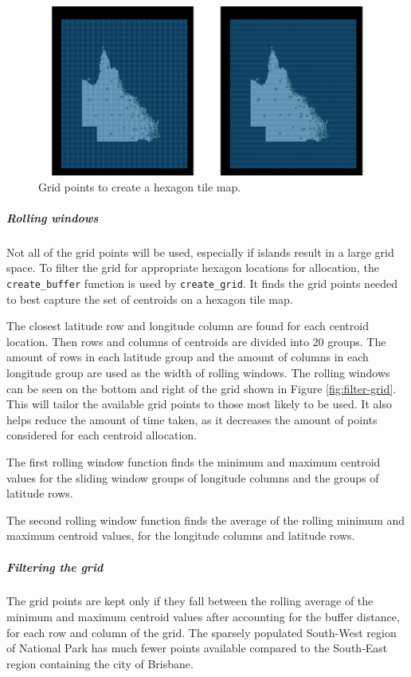 \begin{figure}[h]
\centering
\includegraphics[width=16cm]{figures/2grid.pdf}
\caption{\label{fig:grid2}Grid points to create a hexagon tile map.}
\end{figure}

\hypertarget{rolling-windows}{%
\subparagraph{Rolling windows}\label{rolling-windows}}

Not all of the grid points will be used, especially if islands result in
a large grid space. To filter the grid for appropriate hexagon locations
for allocation, the \texttt{create\_buffer} function is used by
\texttt{create\_grid}. It finds the grid points needed to best capture
the set of centroids on a hexagon tile map.

The closest latitude row and longitude column are found for each
centroid location. Then rows and columns of centroids are divided into
20 groups. The amount of rows in each latitude group and the amount of
columns in each longitude group are used as the width of rolling
windows. The rolling windows can be seen on the bottom and right of the
grid shown in Figure \ref{fig:filter-grid}. This will tailor the
available grid points to those most likely to be used. It also helps
reduce the amount of time taken, as it decreases the amount of points
considered for each centroid allocation.

The first rolling window function finds the minimum and maximum centroid
values for the sliding window groups of longitude columns and the groups
of latitude rows.

The second rolling window function finds the average of the rolling
minimum and maximum centroid values, for the longitude columns and
latitude rows.

\hypertarget{filtering-the-grid}{%
\subparagraph{Filtering the grid}\label{filtering-the-grid}}

The grid points are kept only if they fall between the rolling average
of the minimum and maximum centroid values after accounting for the
buffer distance, for each row and column of the grid. The sparsely
populated South-West region of National Park has much fewer points
available compared to the South-East region containing the city of
Brisbane.

